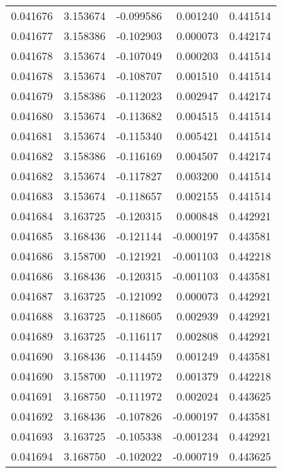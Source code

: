 \begin{tabular}{lrrrr}
0.041676    &  3.153674 & -0.099586 &  0.001240 &             0.441514 \\
0.041677    &  3.158386 & -0.102903 &  0.000073 &             0.442174 \\
0.041678    &  3.153674 & -0.107049 &  0.000203 &             0.441514 \\
0.041678    &  3.153674 & -0.108707 &  0.001510 &             0.441514 \\
0.041679    &  3.158386 & -0.112023 &  0.002947 &             0.442174 \\
0.041680    &  3.153674 & -0.113682 &  0.004515 &             0.441514 \\
0.041681    &  3.153674 & -0.115340 &  0.005421 &             0.441514 \\
0.041682    &  3.158386 & -0.116169 &  0.004507 &             0.442174 \\
0.041682    &  3.153674 & -0.117827 &  0.003200 &             0.441514 \\
0.041683    &  3.153674 & -0.118657 &  0.002155 &             0.441514 \\
0.041684    &  3.163725 & -0.120315 &  0.000848 &             0.442921 \\
0.041685    &  3.168436 & -0.121144 & -0.000197 &             0.443581 \\
0.041686    &  3.158700 & -0.121921 & -0.001103 &             0.442218 \\
0.041686    &  3.168436 & -0.120315 & -0.001103 &             0.443581 \\
0.041687    &  3.163725 & -0.121092 &  0.000073 &             0.442921 \\
0.041688    &  3.163725 & -0.118605 &  0.002939 &             0.442921 \\
0.041689    &  3.163725 & -0.116117 &  0.002808 &             0.442921 \\
0.041690    &  3.168436 & -0.114459 &  0.001249 &             0.443581 \\
0.041690    &  3.158700 & -0.111972 &  0.001379 &             0.442218 \\
0.041691    &  3.168750 & -0.111972 &  0.002024 &             0.443625 \\
0.041692    &  3.168436 & -0.107826 & -0.000197 &             0.443581 \\
0.041693    &  3.163725 & -0.105338 & -0.001234 &             0.442921 \\
0.041694    &  3.168750 & -0.102022 & -0.000719 &             0.443625 \\

\end{tabular}
